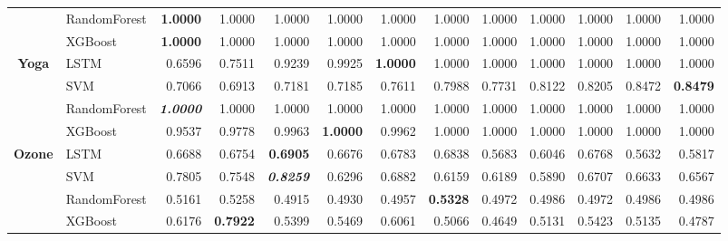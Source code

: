 \begin{table}[H]
\begin{adjustbox}{max width=12cm}
\begin{tabular}{|c|l|r|r|r|r|r|r|r|r|r|r|r|}
			                      & RandomForest & \textbf{1.0000}                   & 1.0000 & 1.0000          & 1.0000 & 1.0000          & 1.0000 & 1.0000          & 1.0000                   & 1.0000                   & 1.0000          & 1.0000 \\
			                      & XGBoost      & \textbf{1.0000}                   & 1.0000 & 1.0000          & 1.0000 & 1.0000          & 1.0000 & 1.0000          & 1.0000                   & 1.0000                   & 1.0000          & 1.0000 \\
			\hline
			\textbf{Yoga}         & LSTM         & 0.6596                   & 0.7511 & 0.9239          & 0.9925 & \textbf{1.0000} & 1.0000 & 1.0000          & 1.0000                   & 1.0000                   & 1.0000          & 1.0000 \\
			                      & SVM          & 0.7066                   & 0.6913 & 0.7181          & 0.7185 & 0.7611          & 0.7988 & 0.7731          & 0.8122                   & 0.8205                   & 0.8472          & \textbf{0.8479} \\
			                      & RandomForest & \textit{\textbf{1.0000}}          & 1.0000 & 1.0000          & 1.0000 & 1.0000          & 1.0000 & 1.0000          & 1.0000                   & 1.0000                   & 1.0000          & 1.0000 \\
			                      & XGBoost      & 0.9537                   & 0.9778 & 0.9963          & \textbf{1.0000} & 0.9962          & 1.0000 & 1.0000          & 1.0000                   & 1.0000                   & 1.0000          & 1.0000 \\
			\hline
			\textbf{Ozone}        & LSTM         & 0.6688                   & 0.6754 & \textbf{0.6905}          & 0.6676 & 0.6783          & 0.6838 & 0.5683          & 0.6046                   & 0.6768                   & 0.5632          & 0.5817 \\
			                      & SVM          & 0.7805                   & 0.7548 & \textit{\textbf{0.8259}} & 0.6296 & 0.6882          & 0.6159 & 0.6189          & 0.5890                   & 0.6707                   & 0.6633          & 0.6567 \\
			                      & RandomForest & 0.5161                   & 0.5258 & 0.4915          & 0.4930 & 0.4957          & \textbf{0.5328} & 0.4972          & 0.4986                   & 0.4972                   & 0.4986          & 0.4986 \\
			                      & XGBoost      & 0.6176                   & \textbf{0.7922} & 0.5399          & 0.5469 & 0.6061          & 0.5066 & 0.4649          & 0.5131                   & 0.5423                   & 0.5135          & 0.4787 \\

\end{tabular}
\end{adjustbox}
\end{table}
